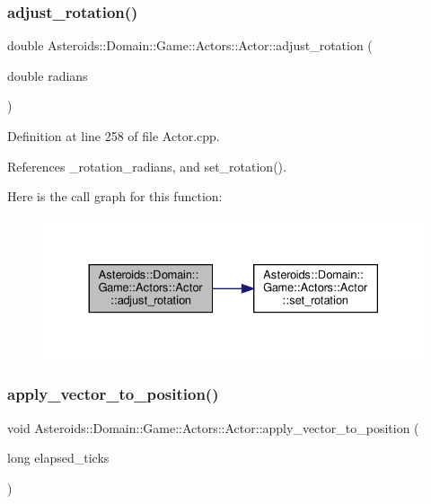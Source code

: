 \subsubsection{\texorpdfstring{adjust\+\_\+rotation()}{adjust\_rotation()}}
{\footnotesize\ttfamily double Asteroids\+::\+Domain\+::\+Game\+::\+Actors\+::\+Actor\+::adjust\+\_\+rotation (\begin{DoxyParamCaption}\item[{double}]{radians }\end{DoxyParamCaption})}



Definition at line 258 of file Actor.\+cpp.



References \+\_\+rotation\+\_\+radians, and set\+\_\+rotation().

Here is the call graph for this function\+:\nopagebreak
\begin{figure}[H]
\begin{center}
\leavevmode
\includegraphics[width=330pt]{classAsteroids_1_1Domain_1_1Game_1_1Actors_1_1Actor_a632126e3d3b8bd311737ca59b623ab7e_cgraph}
\end{center}
\end{figure}
\mbox{\label{classAsteroids_1_1Domain_1_1Game_1_1Actors_1_1Actor_aafec1372aa2f5b203112aae5f6b16310}} 
\subsubsection{\texorpdfstring{apply\+\_\+vector\+\_\+to\+\_\+position()}{apply\_vector\_to\_position()}}
{\footnotesize\ttfamily void Asteroids\+::\+Domain\+::\+Game\+::\+Actors\+::\+Actor\+::apply\+\_\+vector\+\_\+to\+\_\+position (\begin{DoxyParamCaption}\item[{long}]{elapsed\+\_\+ticks }\end{DoxyParamCaption})\hspace{0.3cm}{\ttfamily [private]}}



